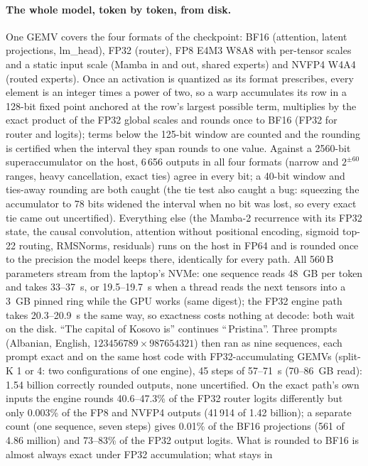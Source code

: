 \documentclass[11pt]{article}
\begin{document}
\paragraph{The whole model, token by token, from disk.} One GEMV covers the four formats of the checkpoint: BF16 (attention,
latent projections, lm\_head), FP32 (router), FP8 E4M3 W8A8 with per-tensor scales and a static input scale (Mamba in and
out, shared experts) and NVFP4 W4A4 (routed experts). Once an activation is quantized as its format prescribes, every
element is an integer times a power of two, so a warp accumulates its row in a 128-bit fixed point anchored at the row's
largest possible term, multiplies by the exact product of the FP32 global scales and rounds once to BF16 (FP32 for router
and logits); terms below the 125-bit window are counted and the rounding is certified when the interval they span rounds to
one value. Against a 2560-bit superaccumulator on the host, 6\,656 outputs in all four formats (narrow and $2^{\pm60}$
ranges, heavy cancellation, exact ties) agree in every bit; a 40-bit window and ties-away rounding are both caught (the tie
test also caught a bug: squeezing the accumulator to 78 bits widened the interval when no bit was lost, so every exact tie
came out uncertified). Everything else (the Mamba-2 recurrence with its FP32 state, the causal convolution, attention
without positional encoding, sigmoid top-22 routing, RMSNorms, residuals) runs on the host in FP64 and is rounded once to
the precision the model keeps there, identically for every path. All 560\,B parameters stream from the laptop's NVMe: one
sequence reads 48~GB per token and takes 33--37~s, or 19.5--19.7~s when a thread reads the next tensors into a 3~GB pinned
ring while the GPU works (same digest); the FP32 engine path takes 20.3--20.9~s the same way, so exactness costs nothing at
decode: both wait on the disk. ``The capital of Kosovo is'' continues ``\,Pristina''. Three prompts (Albanian, English, $123456789\times 987654321$) then ran as nine sequences, each prompt exact
and on the same host code with FP32-accumulating GEMVs (split-K 1 or 4: two configurations of one engine), 45 steps of
57--71~s (70--86~GB read): 1.54 billion correctly rounded outputs, none uncertified. On the exact path's own inputs the
engine rounds 40.6--47.3\% of the FP32 router logits differently but only 0.003\% of the FP8 and NVFP4 outputs (41\,914 of
1.42 billion); a separate count (one sequence, seven steps) gives 0.01\% of the BF16 projections (561 of 4.86 million) and
73--83\% of the FP32 output logits. What is rounded to BF16 is almost always exact under FP32 accumulation; what stays in
\end{document}
